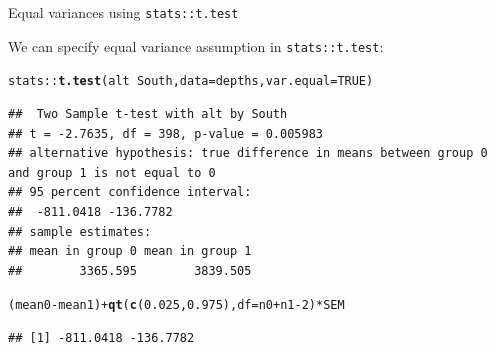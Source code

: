 \documentclass[10pt,handout]{beamer}\usepackage[]{graphicx}\usepackage[]{color}
\makeatletter
\newcommand{\hlnum}[1]{\textcolor[rgb]{0.686,0.059,0.569}{#1}}%
\newcommand{\hlopt}[1]{\textcolor[rgb]{0,0,0}{#1}}%
\newcommand{\hlstd}[1]{\textcolor[rgb]{0.345,0.345,0.345}{#1}}%
\newcommand{\hlkwc}[1]{\textcolor[rgb]{0.333,0.667,0.333}{#1}}%
\newcommand{\hlkwd}[1]{\textcolor[rgb]{0.737,0.353,0.396}{\textbf{#1}}}%
\newenvironment{kframe}{%
 \def\at@end@of@kframe{}%
 \ifinner\ifhmode%
  \def\at@end@of@kframe{\end{minipage}}%
  \begin{minipage}{\columnwidth}%
 \fi\fi%
 \def\FrameCommand##1{\hskip\@totalleftmargin \hskip-\fboxsep
 \colorbox{shadecolor}{##1}\hskip-\fboxsep
     \hskip-\linewidth \hskip-\@totalleftmargin \hskip\columnwidth}%
 \MakeFramed {\advance\hsize-\width
   \@totalleftmargin\z@ \linewidth\hsize
   \@setminipage}}%
 {\par\unskip\endMakeFramed%
 \at@end@of@kframe}
\newenvironment{knitrout}{}{} %
\makeatother
\begin{document}
\begin{frame}[fragile]{Equal variances using \texttt{stats::t.test}}
	
	We can specify equal variance assumption in \texttt{stats::t.test}:
	
\begin{knitrout}\scriptsize
{}\color{fgcolor}\begin{kframe}
\begin{alltt}
\hlstd{stats}\hlopt{::}\hlkwd{t.test}\hlstd{(alt} \hlopt{~} \hlstd{South,} \hlkwc{data} \hlstd{= depths,} \hlkwc{var.equal} \hlstd{=} \hlnum{TRUE}\hlstd{)}
\end{alltt}
\begin{verbatim}
##  Two Sample t-test with alt by South 
## t = -2.7635, df = 398, p-value = 0.005983
## alternative hypothesis: true difference in means between group 0 and group 1 is not equal to 0 
## 95 percent confidence interval:
##  -811.0418 -136.7782 
## sample estimates:
## mean in group 0 mean in group 1 
##        3365.595        3839.505
\end{verbatim}
\begin{alltt}
\hlstd{(mean0} \hlopt{-} \hlstd{mean1)} \hlopt{+} \hlkwd{qt}\hlstd{(}\hlkwd{c}\hlstd{(}\hlnum{0.025}\hlstd{,} \hlnum{0.975}\hlstd{),} \hlkwc{df} \hlstd{= n0} \hlopt{+} \hlstd{n1} \hlopt{-} \hlnum{2}\hlstd{)} \hlopt{*} \hlstd{SEM}
\end{alltt}
\begin{verbatim}
## [1] -811.0418 -136.7782
\end{verbatim}
\end{kframe}
\end{knitrout}
	
	
\end{frame}




\end{document}
